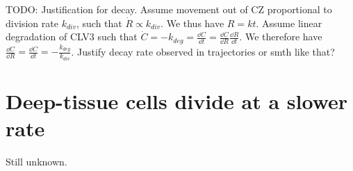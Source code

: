 TODO: Justification for decay. Assume movement out of CZ proportional to
division rate $k_{div}$, such that $\dot{R} \propto k_{div}$. We thus have
$R = kt$. Assume linear degradation of CLV3 such that $\dot{C} = -k_{deg} =
\frac{\dd C}{\dd t} = \frac{\dd C}{\dd R} \frac{\dd R}{\dd t}$. We therefore have
$\frac{\dd C}{\dd R} = \frac{\dd C}{\dd t} = -\frac{k_{deg}}{k_{div}}$. Justify
decay rate observed in trajectories or smth like that?

\section{Deep-tissue cells divide at a slower rate}
Still unknown.

